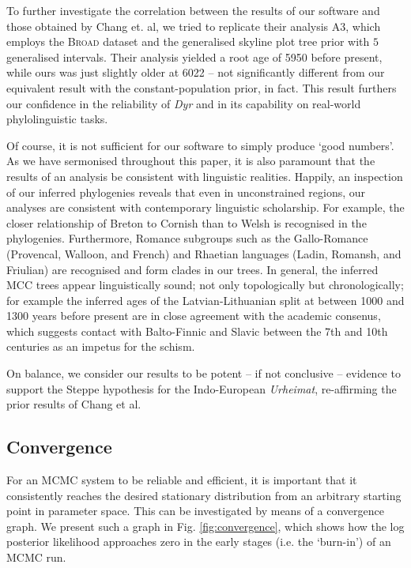 \documentclass[10pt,journal,compsoc]{IEEEtran}
\begin{document}
To further investigate the correlation between the results of our software and those obtained by Chang et. al, we tried to replicate their analysis A3, which employs the \textsc{Broad} dataset and the generalised skyline plot tree prior with $5$ generalised intervals. Their analysis yielded a root age of 5950 before present, while ours was just slightly older at 6022 -- not significantly different from our equivalent result with the constant-population prior, in fact. This result furthers our confidence in the reliability of \textit{Dyr} and in its capability on real-world phylolinguistic tasks.

Of course, it is not sufficient for our software to simply produce `good numbers'. As we have sermonised throughout this paper, it is also paramount that the results of an analysis be consistent with linguistic realities. Happily, an inspection of our inferred phylogenies reveals that even in unconstrained regions, our analyses are consistent with contemporary linguistic scholarship. For example, the closer relationship of Breton to Cornish than to Welsh is recognised in the phylogenies. Furthermore, Romance subgroups such as the Gallo-Romance (Provencal, Walloon, and French) and Rhaetian languages (Ladin, Romansh, and Friulian) are recognised and form clades in our trees. In general, the inferred MCC trees appear linguistically sound; not only topologically but chronologically; for example the inferred ages of the Latvian-Lithuanian split at between 1000 and 1300 years before present are in close agreement with the academic consenus, which suggests contact with Balto-Finnic and Slavic between the 7th and 10th centuries as an impetus for the schism.\cite{baltic2018}

On balance, we consider our results to be potent -- if not conclusive -- evidence to support the Steppe hypothesis for the Indo-European \textit{Urheimat}, re-affirming the prior results of Chang et al.

\subsection{Convergence}

For an MCMC system to be reliable and efficient, it is important that it consistently reaches the desired stationary distribution from an arbitrary starting point in parameter space. This can be investigated by means of a convergence graph. We present such a graph in Fig. \ref{fig:convergence}, which shows how the log posterior likelihood approaches zero in the early stages (i.e. the `burn-in') of an MCMC run.
\end{document}

